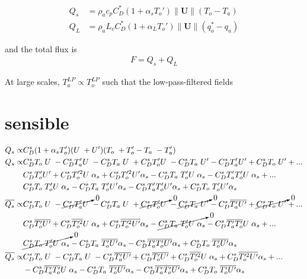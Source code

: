 \documentclass[12pt,a4paper]{article}
\newcommand{\Vmag}[1]{\| \mathbf{#1}\|}
\newcommand{\Ub}{U\hspace*{1mm}}
\newcommand{\Up}{U'}
\newcommand{\To}{T_o\hspace*{1mm}}
\newcommand{\Top}{T_o'}
\newcommand{\Ta}{T_a\hspace*{1mm}}
\newcommand{\Tap}{T_a'}
\newcommand{\CD}{C_D^s}
\begin{document}
\begin{align}
Q_s &= \rho_a c_p C_D^*(1+\alpha_s T_o') \Vmag{U} (T_o-T_a)\\
Q_L &= \rho_a L_v C_D^*(1+\alpha_L T_o') \Vmag{U} (q_o^*-q_a)
\end{align}

and the total flux is 
\begin{align}
F = Q_s + Q_L
\end{align}


At large scales, $T_a^{LP} \propto T_o^{LP}$ such that the low-pass-filtered fields

\section*{sensible}
\begin{align*}
Q_s \propto &\CD(1+\alpha_s \Top) (\Ub+\Up) (\To+\Top-\Ta-\Tap)\\
Q_s \propto &\CD\To\Ub-\CD\Tap\Ub-\CD\Ta\Ub+\CD\Top\Ub-\CD\Ta\Up-\CD\Tap\Up+\CD\To\Up+...\\
&\CD\Top\Up+\CD\Top^2\Ub\alpha_s+\CD\Top^2\Up\alpha_s-\CD\Ta\Top\Ub\alpha_s-\CD\Tap\Top\Ub\alpha_s+...\\
&\CD\To\Top\Ub\alpha_s-\CD\Ta\Top\Up\alpha_s-\CD\Tap\Top\Up\alpha_s+\CD\To\Top\Up\alpha_s\\
\overline{Q_s} \propto &\CD\To\Ub-\cancelto{0}{\CD\Tap\Ub}-\CD\Ta\Ub+\cancelto{0}{\CD\Top\Ub}-\cancelto{0}{\CD\Ta\Up}-\CD\overline{\Tap\Up}+\cancelto{0}{\CD\To\Up}+...\\
&\CD\overline{\Top\Up}+\CD\overline{\Top^2}\Ub\alpha_s+\CD\overline{\Top^2\Up}\alpha_s-\cancelto{0}{\CD\Ta\Top\Ub\alpha_s}-\CD\overline{\Tap\Top}\Ub\alpha_s+...\\
&\cancelto{0}{\CD\To\Top\Ub\alpha_s}-\CD\Ta\overline{\Top\Up}\alpha_s-\CD\overline{\Tap\Top\Up}\alpha_s+\CD\To\overline{\Top\Up}\alpha_s\\
\overline{Q_s} \propto &\CD\To\Ub-\CD\Ta\Ub-\CD\overline{\Tap\Up}+\CD\overline{\Top\Up}+\CD\overline{\Top^2}\Ub\alpha_s+\CD\overline{\Top^2\Up}\alpha_s+...\\
&-\CD\overline{\Tap\Top}\Ub\alpha_s-\CD\Ta\overline{\Top\Up}\alpha_s-\CD\overline{\Tap\Top\Up}\alpha_s+\CD\To\overline{\Top\Up}\alpha_s\\
\end{align*}
\end{document}
